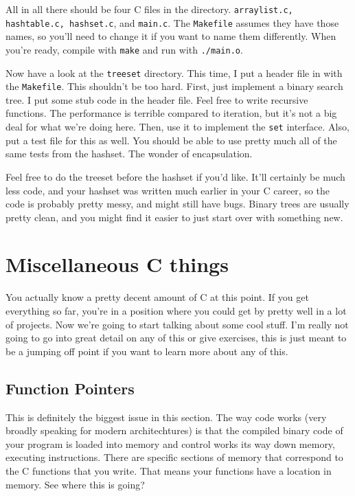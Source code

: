 \documentclass[ebook,11pt,oneside,openany]{memoir}
\newcommand{\cf}[1]{\texttt{#1}}
\begin{document}
All in all there should be four C files in the directory. \cf{arraylist.c, hashtable.c, hashset.c}, and \cf{main.c}. The \cf{Makefile} assumes they have those names, so you'll need to change it if you want to name them differently. When you're ready, compile with \cf{make} and run with \cf{./main.o}.

Now have a look at the \cf{treeset} directory. This time, I put a header file in with the \cf{Makefile}. This shouldn't be too hard. First, just implement a binary search tree. I put some stub code in the header file. Feel free to write recursive functions. The performance is terrible compared to iteration, but it's not a big deal for what we're doing here. Then, use it to implement the \cf{set} interface. Also, put a test file for this as well. You should be able to use pretty much all of the same tests from the hashset. The wonder of encapsulation.

\hfill \break
\noindent
Feel free to do the treeset before the hashset if you'd like. It'll certainly be much less code, and your hashset was written much earlier in your C career, so the code is probably pretty messy, and might still have bugs. Binary trees are usually pretty clean, and you might find it easier to just start over with something new.

\chapter{Miscellaneous C things}

You actually know a pretty decent amount of C at this point. If you get everything so far, you're in a position where you could get by pretty well in a lot of projects. Now we're going to start talking about some cool stuff. I'm really not going to go into great detail on any of this or give exercises, this is just meant to be a jumping off point if you want to learn more about any of this.

\section{Function Pointers}
\label{sec:fctn}

This is definitely the biggest issue in this section. The way code works (very broadly speaking for modern architechtures) is that the compiled binary code of your program is loaded into memory and control works its way down memory, executing instructions. There are specific sections of memory that correspond to the C functions that you write. That means your functions have a location in memory. See where this is going?
\end{document}
